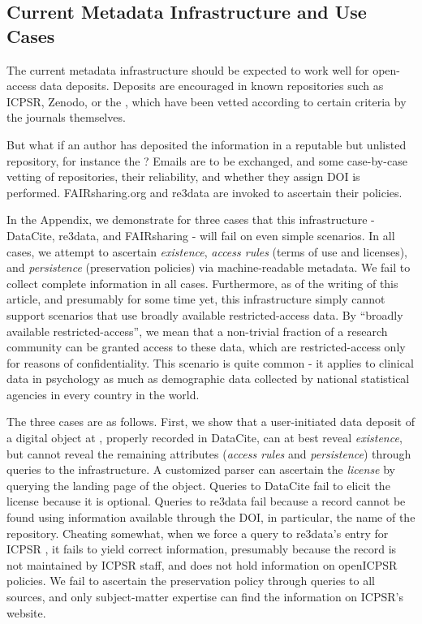 \subsection{Current Metadata Infrastructure and Use Cases}
The current metadata infrastructure should be expected to work well for open-access data deposits. Deposits are encouraged in known repositories such as \ac{ICPSR}, Zenodo, or the , which have been vetted according to certain criteria by the journals themselves.

But what if an author has deposited the information in a reputable but unlisted repository, for instance the ? Emails are to be exchanged, and some case-by-case vetting of repositories, their reliability, and whether they assign \ac{DOI} is performed. FAIRsharing.org and re3data are invoked to ascertain their policies. 

In the Appendix, we demonstrate for three cases that this infrastructure - DataCite, re3data, and FAIRsharing - will fail on even simple scenarios. In all cases, we attempt to ascertain \textit{existence}, \textit{access rules} (terms of use and licenses), and \textit{persistence} (preservation policies) via machine-readable metadata. We fail to collect complete information in  all cases. Furthermore, as of the writing of this article, and presumably for some time yet, this infrastructure simply cannot support scenarios that use broadly available restricted-access data. By ``broadly available restricted-access'', we mean that a non-trivial fraction of a research community can be granted access to these data, which are restricted-access only for reasons of confidentiality. This scenario is quite common - it applies to clinical data in psychology as much as demographic data collected by national statistical agencies in every country in the world. 

The three cases are as follows. First, we show that a user-initiated data deposit of a digital  object at  , properly recorded in DataCite, can at best reveal \textit{existence}, but cannot reveal the remaining attributes (\textit{access rules} and \textit{persistence}) through queries to the infrastructure. A customized parser can ascertain the \textit{license} by querying the landing page of the object. Queries to DataCite fail to elicit the  license because it is optional. Queries to re3data fail because a record cannot be found using information available through the \ac{DOI}, in particular, the name of the repository. Cheating somewhat, when we force a query to re3data's entry for \ac{ICPSR} \parencite{Re3data-icpsr}, it fails to yield correct information, presumably because the record is not maintained by ICPSR staff, and does not hold information on openICPSR policies. We fail to ascertain the preservation policy through queries to all sources, and only subject-matter expertise can find the information on ICPSR's website. 

